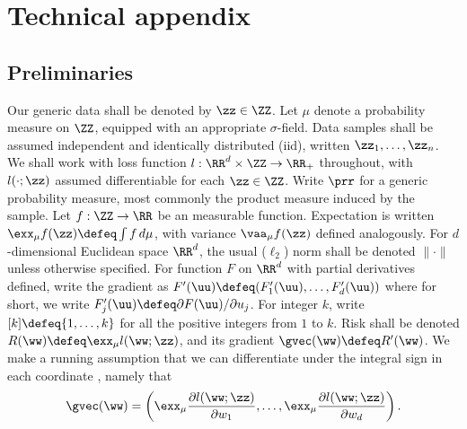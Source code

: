 \documentclass[11pt,oneside]{article}
\theoremstyle{definition} \newtheorem{defn}{Definition}       %
\theoremstyle{plain} \newtheorem{prop}[defn]{Proposition}           %
\theoremstyle{plain} \newtheorem{thm}[defn]{Theorem}                %
\theoremstyle{plain} \newtheorem{lem}[defn]{Lemma}                  %
\theoremstyle{plain} \newtheorem{cor}[defn]{Corollary}              %
\theoremstyle{remark} \newtheorem{rmk}[defn]{Remark}                %
\theoremstyle{remark} \newtheorem{ex}[defn]{Example}                %
\begin{document}
{\small


}


\appendix

\section{Technical appendix}\label{sec:appendix}

\subsection{Preliminaries}\label{sec:prelims}

Our generic data shall be denoted by $\zz \in \ZZ$. Let $\mu$ denote a probability measure on $\ZZ$, equipped with an appropriate $\sigma$-field. Data samples shall be assumed independent and identically distributed (iid), written $\zz_{1},\ldots,\zz_{n}$. We shall work with loss function $l:\RR^{d} \times \ZZ \to \RR_{+}$ throughout, with $l(\cdot;\zz)$ assumed differentiable for each $\zz \in \ZZ$. Write $\prr$ for a generic probability measure, most commonly the product measure induced by the sample. Let $f:\ZZ \to \RR$ be an measurable function. Expectation is written $\exx_{\mu}f(\zz) \defeq \int f \, d\mu$, with variance $\vaa_{\mu}f(\zz)$ defined analogously. For $d$-dimensional Euclidean space $\RR^{d}$, the usual ($\ell_{2}$) norm shall be denoted $\|\cdot\|$ unless otherwise specified. For function $F$ on $\RR^{d}$ with partial derivatives defined, write the gradient as $F^{\prime}(\uu) \defeq (F^{\prime}_{1}(\uu),\ldots,F^{\prime}_{d}(\uu))$ where for short, we write $F^{\prime}_{j}(\uu) \defeq \partial F(\uu)/\partial u_{j}$. For integer $k$, write $[k] \defeq \{1,\ldots,k\}$ for all the positive integers from $1$ to $k$. Risk shall be denoted $R(\ww) \defeq \exx_{\mu}l(\ww;\zz)$, and its gradient $\gvec(\ww) \defeq R^{\prime}(\ww)$. We make a running assumption that we can differentiate under the integral sign in each coordinate \citep{ash2000a,talvila2001a}, namely that
%
\begin{align}\label{eqn:diff_under_integral}
\gvec(\ww) = \left(\exx_{\mu}\frac{\partial l(\ww;\zz)}{\partial w_{1}}, \ldots, \exx_{\mu}\frac{\partial l(\ww;\zz)}{\partial w_{d}}\right).
\end{align}
\end{document}
